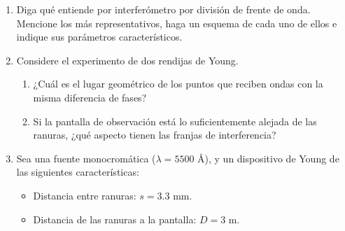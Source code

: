 \documentclass[11pt,spanish]{article}
\begin{document}
\begin{enumerate}
    \begin{enumerate}
        \item La señal es una señal armónica de frecuencia $\omega$.
        
        \item La señal es periódica con período $\tau$ (no necesariamente
        armónica).
        
        \item La señal es ruido blanco\footnote{El ruido blanco es una señal
        aleatoria cuyas muestras cumplen una cierta distribución, por ejemplo
        uniforme o Gaussiana, y además son independientes entre sí.}.
    \end{enumerate}


\section*{División de frente de onda}


    \item Diga qué entiende por interferómetro por división de frente de onda.
    Mencione los más representativos, haga un esquema de cada uno de ellos
    e indique sus parámetros característicos.

    
    \item Considere el experimento de dos rendijas de Young.
    \begin{enumerate}
        \item ¿Cuál es el lugar geométrico de los puntos que reciben ondas con
        la misma diferencia de fases?
        
        \item Si la pantalla de observación está lo suficientemente alejada de
        las ranuras, ¿qué aspecto tienen las franjas de interferencia?
    \end{enumerate}
    

    \item Sea una fuente monocromática ($\lambda=5500$ Å), y un dispositivo
    de Young de las siguientes características: 
    \begin{itemize}
        \item Distancia entre ranuras: $s=3.3$ mm. 
        \item Distancia de las ranuras a la pantalla: $D=3$ m.
    \end{itemize}


\end{enumerate}
\end{document}
